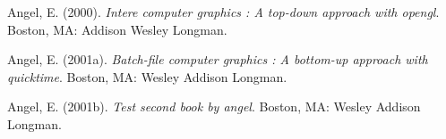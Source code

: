 \documentclass[12pt,twoside]{reedthesis}
\theoremstyle{definition}
\theoremstyle{definition}
\theoremstyle{definition}
\theoremstyle{remark}
\begin{document}

\noindent

\setlength{\parindent}{-0.20in} \setlength{\leftskip}{0.20in}
\setlength{\parskip}{8pt}

\hypertarget{refs}{}
\hypertarget{ref-angel2000}{}
Angel, E. (2000). \emph{Intere computer graphics : A top-down approach
with opengl}. Boston, MA: Addison Wesley Longman.

\hypertarget{ref-angel2001}{}
Angel, E. (2001a). \emph{Batch-file computer graphics : A bottom-up
approach with quicktime}. Boston, MA: Wesley Addison Longman.

\hypertarget{ref-angel2002a}{}
Angel, E. (2001b). \emph{Test second book by angel}. Boston, MA: Wesley
Addison Longman.

\end{document}
